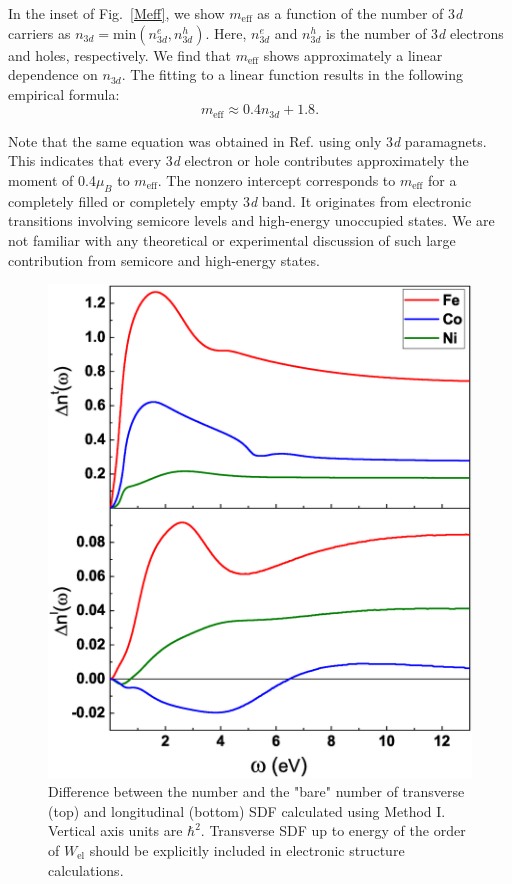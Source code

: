 In the inset of Fig.~\ref{Meff}, we show $m_{\text{eff}}$ as a function of the number of 3\emph{d} carriers as $n_{3d}=\text{min}\left(n_{3d}^{e},n_{3d}^{h}\right)$. Here, $n_{3d}^{e}$ and $n_{3d}^{h}$ is the number of 3\emph{d} electrons and holes, respectively. We find that $m_{\text{eff}}$ shows approximately a linear dependence on $n_{3d}$. The fitting to a linear function results in the following empirical formula: 
\begin{equation}
m_{\text{eff}} \approx 0.4 n_{3d} +1.8.
\end{equation} 

Note that the same equation was obtained in Ref. \citep{Wysocki} using only 3\emph{d} paramagnets. This indicates that every 3\emph{d} electron or hole contributes approximately the moment of 0.4$\mu_{B}$ to $m_{\text{eff}}$. The nonzero intercept corresponds to $m_{\text{eff}}$ for a completely filled or completely empty 3\emph{d} band. It originates from electronic transitions involving semicore levels and high-energy unoccupied states. We are not familiar with any theoretical or experimental discussion of such large contribution from semicore and high-energy states.

\begin{figure}[h!]
\centering
\includegraphics[width=0.55\hsize]{Chapters/TDDFT/figures/Article/Delnsf.eps}
\caption{Difference between the number and the "bare" number of transverse (top) and longitudinal (bottom) SDF calculated using Method I. Vertical axis units are $\hbar^2$. Transverse SDF up to energy of the order of $W_{\text{el}}$ should be explicitly included in electronic structure calculations.}
\label{Delnsf}
\end{figure} 

